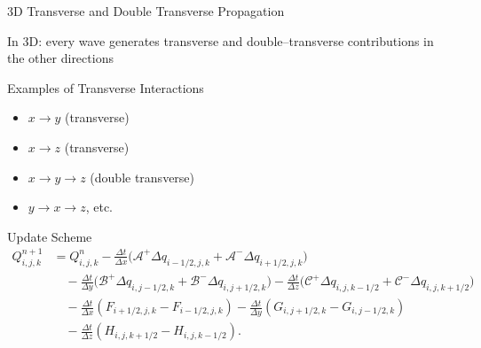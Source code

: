 \begin{frame}{3D Transverse and Double Transverse Propagation}
	\scriptsize
	
    In 3D: every wave generates transverse and double–transverse contributions in the other directions

\vspace{0.5em} 
Examples of Transverse Interactions
		\begin{itemize}
			\item $x \to y$ (transverse) 
			\item $x \to z$ (transverse)
			\item $x \to y \to z$ (double transverse)
			\item $y \to x \to z$, etc.
		\end{itemize}

	\begin{block}{Update Scheme}
	\[
	\begin{aligned}
		Q_{i,j,k}^{n+1} &= Q_{i,j,k}^n
		- \frac{\Delta t}{\Delta x} \Big( \mathcal{A}^+ \Delta q_{i-1/2,j,k}
		+ \mathcal{A}^- \Delta q_{i+1/2,j,k} \Big) \\
		& \quad- \frac{\Delta t}{\Delta y} \Big( \mathcal{B}^+ \Delta q_{i,j-1/2,k}
		+ \mathcal{B}^- \Delta q_{i,j+1/2,k} \Big) 
		- \frac{\Delta t}{\Delta z} \Big( \mathcal{C}^+ \Delta q_{i,j,k-1/2}
		+ \mathcal{C}^- \Delta q_{i,j,k+1/2} \Big) \\
		&\quad - \frac{\Delta t}{\Delta x} \left( F_{i+1/2,j,k} - F_{i-1/2,j,k} \right) 
		- \frac{\Delta t}{\Delta y} \left( G_{i,j+1/2,k} - G_{i,j-1/2,k} \right) \\
		&\quad- \frac{\Delta t}{\Delta z} \left( H_{i,j,k+1/2} - H_{i,j,k-1/2} \right).
	\end{aligned}
	\]
\end{block}
\end{frame}



